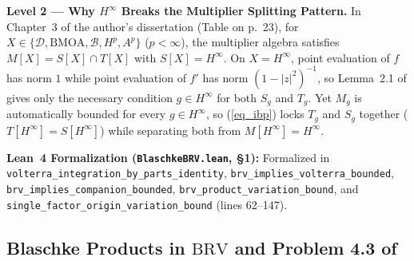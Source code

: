 \documentclass[11pt,reqno]{amsart}
\numberwithin{equation}{section}
\newcommand{\BRV}{\mathrm{BRV}}
\begin{document}
\begin{leveltwo}
\noindent\textbf{\textcolor{l2border}{Level 2 --- Why $H^\infty$ Breaks the Multiplier Splitting Pattern.}}
In Chapter~3 of the author's dissertation \cite{And10} (Table on p.~23), for $X \in \{\mathcal{D}, \mathrm{BMOA}, \mathcal{B}, H^p, A^p\}$ ($p < \infty$), the multiplier algebra satisfies $M[X] = S[X] \cap T[X]$ with $S[X] = H^\infty$. On $X = H^\infty$, point evaluation of $f$ has norm $1$ while point evaluation of $f'$ has norm $(1-|z|^2)^{-1}$, so Lemma~2.1 of \cite{AJS14} gives only the necessary condition $g \in H^\infty$ for both $S_g$ and $T_g$. Yet $M_g$ is automatically bounded for every $g \in H^\infty$, so (\ref{eq_ibp}) locks $T_g$ and $S_g$ together ($T[H^\infty] = S[H^\infty]$) while separating both from $M[H^\infty] = H^\infty$.

\smallskip
\noindent\textbf{\textcolor{leannote}{Lean~4 Formalization (\texttt{BlaschkeBRV.lean}, \S 1):}} Formalized in \texttt{volterra\_integration\_by\_parts\_identity}, \texttt{brv\_implies\_volterra\_bounded}, \texttt{brv\_implies\_companion\_bounded}, \texttt{brv\_product\_variation\_bound}, and \texttt{single\_factor\_origin\_variation\_bound} (lines 62--147).
\end{leveltwo}

\subsection{Blaschke Products in $\BRV$ and Problem 4.3 of \cite{AJS14}}
\end{document}
